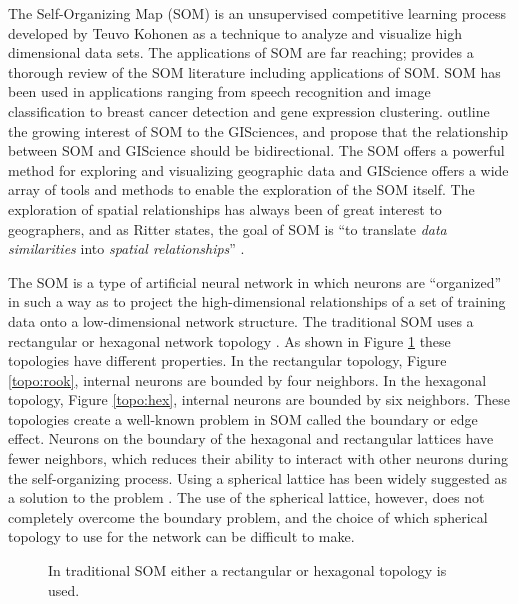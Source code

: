 
The Self-Organizing Map (SOM) is an unsupervised competitive learning process
developed by Teuvo Kohonen as a technique to analyze and visualize high
dimensional data sets.  The applications of SOM are far reaching;
\cite{Kohonen2000} provides a thorough review of the SOM literature including
applications of SOM.  SOM has been used in applications ranging from speech
recognition and image classification to breast cancer detection and gene
expression clustering.  \cite{skupin08} outline the growing interest of SOM to
the GISciences, and propose that the relationship between SOM and GIScience
should be bidirectional.  The SOM offers a powerful method for exploring and
visualizing geographic data and GIScience offers a wide array of tools and
methods to enable the exploration of the SOM itself.  The exploration of spatial
relationships has always been of great interest to geographers, and as Ritter
states, the goal of SOM is ``to translate \emph{data similarities} into
\emph{spatial relationships}'' \cite[p. 1]{ritter99}.

The SOM is a type of artificial neural network in which neurons are ``organized''
in such a way as to project the high-dimensional relationships of a set of
training data onto a low-dimensional network structure.  The traditional
SOM uses a rectangular or hexagonal network topology \citep{Kohonen2000}.  
As shown in Figure \ref{topos} these topologies have different properties.  In
the rectangular topology, Figure \ref{topo:rook}, internal neurons are bounded
by four neighbors.  In the hexagonal topology, Figure \ref{topo:hex}, internal
neurons are bounded by six neighbors. These topologies create a well-known
problem in SOM called the boundary or edge effect.  Neurons on the boundary of
the hexagonal and rectangular lattices have fewer neighbors, which reduces their
ability to interact with other neurons during the self-organizing process.
Using a spherical lattice has been widely suggested as a solution to the problem
\citep{ritter99, boudjemai2003, sangole03, Nishio:2006fk, wu2006}. The use of
the spherical lattice, however, does not completely overcome the boundary
problem, and the choice of which spherical topology to use for the network can
be difficult to make.

\begin{figure}
\centering
\caption{In traditional SOM either a rectangular or hexagonal topology is used.}
\label{topos}
\end{figure}



